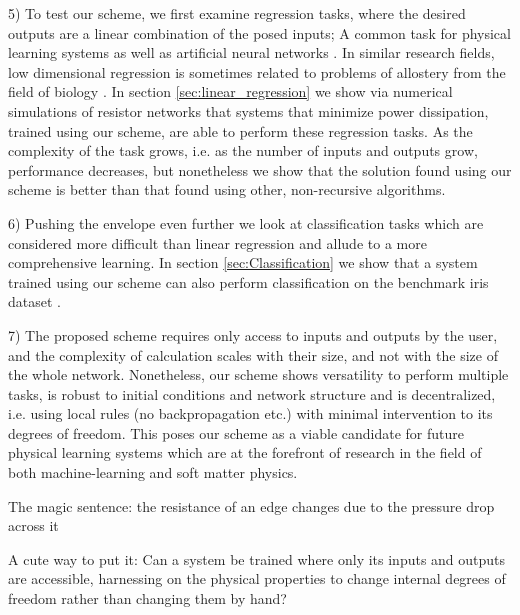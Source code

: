\documentclass[%
 reprint,
 amsmath,amssymb,
 aps,
]{revtex4-2}
\begin{document}
    5) To test our scheme, we first examine regression tasks, where the desired outputs are a linear combination of the posed inputs; A common task for physical learning systems \cite{altman2024experimental, dillavou2022demonstration} as well as artificial neural networks \cite{bishop2006pattern, tibshirani1996regression}. In similar research fields, low dimensional regression is sometimes related to problems of allostery from the field of biology \cite{rocks2017designing, stern2021supervised, ribeiro2016chemical}. 
    In section \ref{sec:linear_regression} we show via numerical simulations of resistor networks that systems that minimize power dissipation, trained using our scheme, are able to perform these regression tasks. As the complexity of the task grows, i.e. as the number of inputs and outputs grow, performance decreases, but nonetheless we show that the solution found using our scheme is better than that found using other, non-recursive algorithms.
    
    6) Pushing the envelope even further we look at classification tasks \cite{lecun2015deep, wright2022deep} which are considered more difficult than linear regression and allude to a more comprehensive learning. In section \ref{sec:Classification} we show that a system trained using our scheme can also perform classification on the benchmark iris dataset \cite{fisher1936use}.

    7) The proposed scheme requires only access to inputs and outputs by the user, and the complexity of calculation scales with their size, and not with the size of the whole network. Nonetheless, our scheme shows versatility to perform multiple tasks, is robust to initial conditions and network structure and is decentralized, i.e. using local rules (no backpropagation etc.) with minimal intervention to its degrees of freedom. This poses our scheme as a viable candidate for future physical learning systems which are at the forefront of research in the field of both machine-learning and soft matter physics.

    \textcolor{roie}{The magic sentence: the resistance of an edge changes due to the pressure drop across it}

    \textcolor{roie}{A cute way to put it: Can a system be trained where only its inputs and outputs are accessible, harnessing on the physical properties to change internal degrees of freedom rather than changing them by hand?}
    
\end{document}
